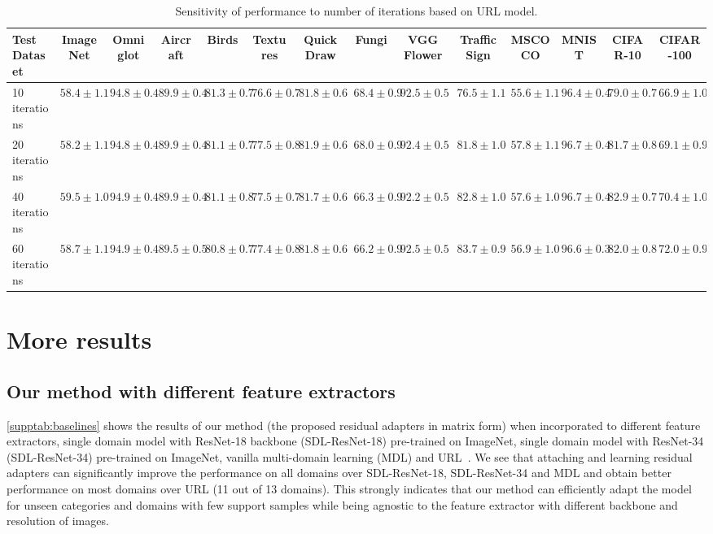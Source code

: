 \begin{table*}[h!]
	\centering
    \resizebox{1.0\textwidth}{!}
    {
		\begin{tabular}{lcccccccc|ccccc}

		    \toprule
		    Test Dataset & ImageNet & Omniglot & Aircraft & Birds & Textures & Quick Draw & Fungi & VGG Flower & Traffic Sign & MSCOCO & MNIST & CIFAR-10 & CIFAR-100\\
		    \midrule
		    10 iterations & $58.4 \pm 1.1$ & $94.8 \pm 0.4$ & $89.9 \pm 0.4$ & $81.3 \pm 0.7$ & $76.6 \pm 0.7$ & $81.8 \pm 0.6$ & $68.4 \pm 0.9$ & $92.5 \pm 0.5$ & $76.5 \pm 1.1$ & $55.6 \pm 1.1$ & $96.4 \pm 0.4$ & $79.0 \pm 0.7$ & $66.9 \pm 1.0$ \\
		    20 iterations & $58.2 \pm 1.1$ & $94.8 \pm 0.4$ & $89.9 \pm 0.4$ & $81.1 \pm 0.7$ & $77.5 \pm 0.8$ & $81.9 \pm 0.6$ & $68.0 \pm 0.9$ & $92.4 \pm 0.5$ & $81.8 \pm 1.0$ & $57.8 \pm 1.1$ & $96.7 \pm 0.4$ & $81.7 \pm 0.8$ & $69.1 \pm 0.9$ \\
		    40 iterations & $59.5 \pm 1.0$ & $94.9 \pm 0.4$ & $89.9 \pm 0.4$ & $81.1 \pm 0.8$ & $77.5 \pm 0.7$ & $81.7 \pm 0.6$ & $66.3 \pm 0.9$ & $92.2 \pm 0.5$ & $82.8 \pm 1.0$ & $57.6 \pm 1.0$ & $96.7 \pm 0.4$ & $82.9 \pm 0.7$ & $70.4 \pm 1.0$ \\
		    60 iterations & $58.7 \pm 1.1$ & $94.9 \pm 0.4$ & $89.5 \pm 0.5$ & $80.8 \pm 0.7$ & $77.4 \pm 0.8$ & $81.8 \pm 0.6$ & $66.2 \pm 0.9$ & $92.5 \pm 0.5$ & $83.7 \pm 0.9$ & $56.9 \pm 1.0$ & $96.6 \pm 0.3$ & $82.0 \pm 0.8$ & $72.0 \pm 0.9$ \\
			\bottomrule
		\end{tabular}%
			}
		\vspace{-0.25cm}
		\caption{Sensitivity of performance to number of iterations based on URL model.}
		\label{supptab:urliterations}
\end{table*}%

\section{More results}

\subsection{Our method with different feature extractors} 
\cref{supptab:baselines} shows the results of our method (the proposed residual adapters in matrix form) when incorporated to different feature extractors, single domain model with ResNet-18 backbone (SDL-ResNet-18) pre-trained on ImageNet, single domain model with ResNet-34 (SDL-ResNet-34) pre-trained on ImageNet, vanilla multi-domain learning (MDL) and URL~\cite{li2021universal}. We see that attaching and learning residual adapters can significantly improve the performance on all domains over SDL-ResNet-18, SDL-ResNet-34 and MDL and obtain better performance on most domains over URL (11 out of 13 domains). This strongly indicates that our method can efficiently adapt the model for unseen categories and domains with few support samples while being agnostic to the feature extractor with different backbone and resolution of images.

